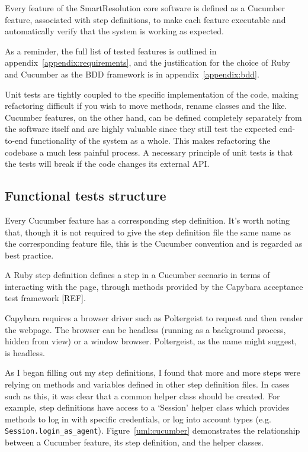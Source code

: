 Every feature of the SmartResolution core software is defined as a Cucumber feature, associated with step definitions, to make each feature executable and automatically verify that the system is working as expected.

As a reminder, the full list of tested features is outlined in appendix~\ref{appendix:requirements}, and the justification for the choice of Ruby and Cucumber as the BDD framework is in appendix~\ref{appendix:bdd}.

Unit tests are tightly coupled to the specific implementation of the code, making refactoring difficult if you wish to move methods, rename classes and the like. Cucumber features, on the other hand, can be defined completely separately from the software itself and are highly valuable since they still test the expected end-to-end functionality of the system as a whole. This makes refactoring the codebase a much less painful process. A necessary principle of unit tests is that the tests will break if the code changes its external API.

\subsection{Functional tests structure}

Every Cucumber feature has a corresponding step definition. It's worth noting that, though it is not required to give the step definition file the same name as the corresponding feature file, this is the Cucumber convention and is regarded as best practice.

A Ruby step definition defines a step in a Cucumber scenario in terms of interacting with the page, through methods provided by the Capybara acceptance test framework [REF]. %

Capybara requires a browser driver such as Poltergeist to request and then render the webpage. The browser can be headless (running as a background process, hidden from view) or a window browser. Poltergeist, as the name might suggest, is headless. %

As I began filling out my step definitions, I found that more and more steps were relying on methods and variables defined in other step definition files. In cases such as this, it was clear that a common helper class should be created. For example, step definitions have access to a `Session' helper class which provides methods to log in with specific credentials, or log into account types (e.g. \lstinline{Session.login_as_agent}). Figure~\ref{uml:cucumber} demonstrates the relationship between a Cucumber feature, its step definition, and the helper classes.

